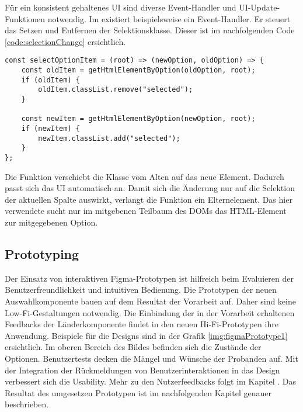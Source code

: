 Für ein konsistent gehaltenes UI sind diverse Event-Handler und UI-Update-Funk\-tion\-en notwendig. 
Im  existiert beispielsweise ein Event-Hand\-ler. 
Er steuert das Setzen und Entfernen der Selektionsklasse. 
Dieser ist im nachfolgenden Code \ref{code:selectionChange} ersichtlich. 

\begin{lstlisting}[style = htmlcssjs, caption = Änderung der Selektion, label = code:selectionChange]
const selectOptionItem = (root) => (newOption, oldOption) => {
    const oldItem = getHtmlElementByOption(oldOption, root);
    if (oldItem) {
        oldItem.classList.remove("selected");
    }

    const newItem = getHtmlElementByOption(newOption, root);
    if (newItem) {
        newItem.classList.add("selected");
    }
}; 
\end{lstlisting}

Die Funktion  verschiebt die Klasse  vom Alten auf das neue Element. 
Dadurch passt sich das UI automatisch an. 
Damit sich die Änderung nur auf die Selektion der aktuellen Spalte auswirkt, verlangt die Funktion ein Elternelement. 
Das hier verwendete  sucht nur im mitgebenen Teilbaum des DOMs das HTML-Element zur mitgegebenen Option. 


\subsection{Prototyping}
\label{sec:userFeedbackPrototyping}

Der Einsatz von interaktiven Figma-Prototypen ist hilfreich beim Evaluieren der Benutzerfreundlichkeit und intuitiven Bedienung. 
Die Prototypen der neuen Auswahlkomponente bauen auf dem Resultat der Vorarbeit auf. 
Daher sind keine Low-Fi-Gestaltungen notwendig. 
Die Einbindung der in der Vorarbeit erhaltenen Feedbacks der Länderkomponente findet in den neuen Hi-Fi-Prototypen ihre Anwendung. 
Beispiele für die Designs sind in der Grafik \ref{img:figmaPrototype1} ersichtlich. 
Im oberen Bereich des Bildes befinden sich die Zustände der Optionen. 
Benutzertests decken die Mängel und Wünsche der Probanden auf. 
Mit der Integration der Rückmeldungen von Benutzerinteraktionen in das Design verbessert sich die Usability. 
Mehr zu den Nutzerfeedbacks folgt im Kapitel \textbf{}. 
Das Resultat des umgesetzen Prototypen ist im nachfolgenden Kapitel genauer beschrieben. 


